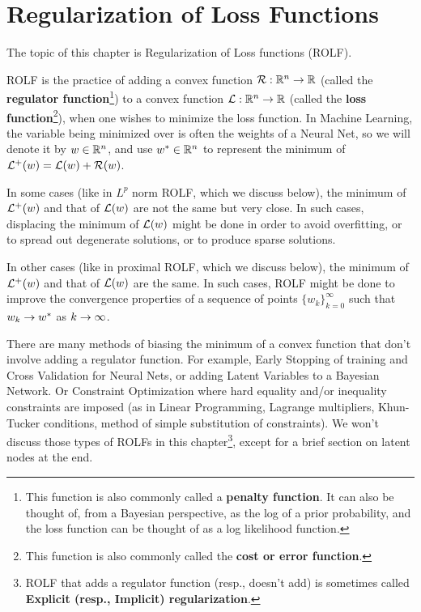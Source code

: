 \chapter{Regularization of Loss Functions}
\label{ch-regularization}


 The topic
 of this chapter is Regularization of Loss functions (ROLF).

ROLF is the practice of adding 
a convex function  ${\cal R}:{ \mathbb{R}}^n\rightarrow { \mathbb{R}}$
(called the {\bf regulator function}\footnote{This function is also commonly called a {\bf penalty function}.
It can  also be thought  of, from a Bayesian perspective,
as the log of a prior probability, and the loss function can be thought of as a log likelihood function.}) to
a convex function  ${\cal L}:{ \mathbb{R}}^n\rightarrow { \mathbb{R}}$
(called the {\bf  loss function}\footnote{This function is also commonly
called the {\bf cost or error function}.}), when one
wishes to minimize the loss function. In Machine Learning,
the variable being minimized over is often the weights 
of a Neural Net, so we will denote it by $w\in { \mathbb{R}}^n$, and use $w^*\in { \mathbb{R}}^n$
to represent the
minimum of ${\cal L}^+(w) ={\cal L}(w)+ {\cal R}(w)$. 

In some cases (like in $L^p$ norm ROLF,
which we discuss below),
the minimum of ${\cal L}^+(w)$
and that of ${\cal L}(w)$
are not the same but very close. In such cases,
displacing the minimum of 
${\cal L}(w)$ 
might be done in order
to avoid overfitting, or
to spread out degenerate solutions, or to produce
sparse solutions. 

In other cases (like in proximal ROLF, which we discuss below),
the minimum of ${\cal L}^+(w)$
and that of ${\cal L}(w)$
are the  same. 
In such cases, ROLF might be done
to improve the
convergence properties
of a sequence of points
$\{w_k\}_{k=0}^\infty$
such that $w_k\rightarrow w^*$
as $k
\rightarrow \infty$.

There are many methods
of biasing the 
minimum of a convex function that  don't
involve adding a regulator
function.
For example, Early Stopping
of training 
and Cross Validation for Neural Nets,
or adding Latent Variables
to a Bayesian Network.
Or Constraint Optimization where hard equality and/or inequality constraints are imposed (as in Linear Programming,
Lagrange multipliers, Khun-Tucker conditions, method of simple substitution of constraints).
We won't discuss those types of
ROLFs in this chapter\footnote{ROLF that adds a regulator function (resp., doesn't add)
is sometimes called {\bf Explicit (resp., Implicit)
regularization}.}, except for a brief section on latent nodes at the end.



